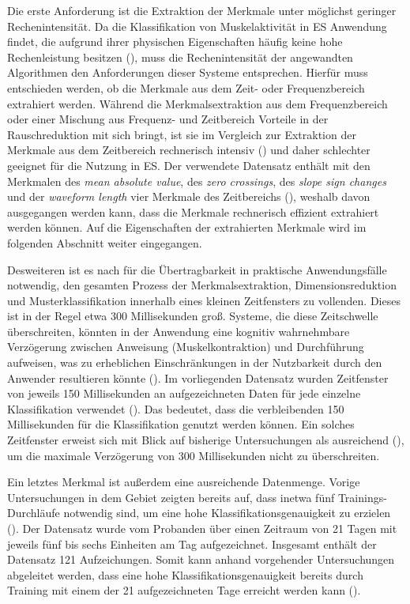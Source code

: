 Die erste Anforderung ist die Extraktion der Merkmale unter möglichst geringer Rechenintensität. Da die Klassifikation von Muskelaktivität in ES Anwendung findet, die aufgrund ihrer physischen Eigenschaften häufig keine hohe Rechenleistung besitzen (\cite{Allard2019}), muss die Rechenintensität der angewandten Algorithmen den Anforderungen dieser Systeme entsprechen. Hierfür muss entschieden werden, ob die Merkmale aus dem Zeit- oder Frequenzbereich extrahiert werden. Während die Merkmalsextraktion aus dem Frequenzbereich oder einer Mischung aus Frequenz- und Zeitbereich Vorteile in der Rauschreduktion mit sich bringt, ist sie im Vergleich zur Extraktion der Merkmale aus dem Zeitbereich rechnerisch intensiv (\cite{zecca2002control}) und daher schlechter geeignet für die Nutzung in ES. Der verwendete Datensatz enthält mit den Merkmalen des \textit{mean absolute value}, des \textit{zero crossings}, des \textit{slope sign changes} und der \textit{waveform length} vier Merkmale des Zeitbereichs (\cite{Kaufmann2013Data}), weshalb davon ausgegangen werden kann, dass die Merkmale rechnerisch effizient extrahiert werden können. Auf die Eigenschaften der extrahierten Merkmale wird im folgenden Abschnitt weiter eingegangen.

Desweiteren ist es nach \cite{Engelhart2003} für die Übertragbarkeit in praktische Anwendungsfälle notwendig, den gesamten Prozess der Merkmalsextraktion, Dimensionsreduktion und Musterklassifikation innerhalb eines kleinen Zeitfensters zu vollenden. Dieses ist in der Regel etwa 300 Millisekunden groß. Systeme, die diese Zeitschwelle überschreiten, könnten in der Anwendung eine kognitiv wahrnehmbare Verzögerung zwischen Anweisung (Muskelkontraktion) und Durchführung aufweisen, was zu erheblichen Einschränkungen in der Nutzbarkeit durch den Anwender resultieren könnte (\cite{Engelhart2003}). Im vorliegenden Datensatz wurden Zeitfenster von jeweils 150 Millisekunden an aufgezeichneten Daten für jede einzelne Klassifikation verwendet (\cite{Kaufmann2013Data}). Das bedeutet, dass die verbleibenden 150 Millisekunden für die Klassifikation genutzt werden können. Ein solches Zeitfenster erweist sich mit Blick auf bisherige Untersuchungen als ausreichend (\cite{Engelhart2003}), um die maximale Verzögerung von 300 Millisekunden nicht zu überschreiten.

Ein letztes Merkmal ist außerdem eine ausreichende Datenmenge. Vorige Untersuchungen in dem Gebiet zeigten bereits auf, dass inetwa fünf Trainings-Durchläufe notwendig sind, um eine hohe Klassifikationsgenauigkeit zu erzielen (\cite{Kaufmann2013}).  Der Datensatz wurde vom Probanden über einen Zeitraum von 21 Tagen mit jeweils fünf bis sechs Einheiten am Tag aufgezeichnet. Insgesamt enthält der Datensatz 121 Aufzeichungen.  Somit kann anhand vorgehender Untersuchungen abgeleitet werden, dass eine hohe Klassifikationsgenauigkeit bereits durch Training mit einem der 21 aufgezeichneten Tage erreicht werden kann (\cite{Kaufmann2013Data}).

